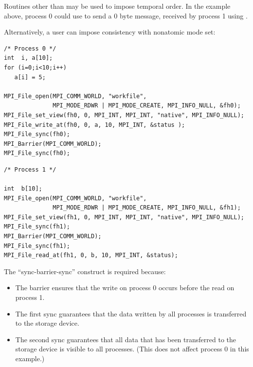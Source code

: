 \begin{users}
Routines other than  may be used to impose 
temporal order.  In the example above, process 0 could use 
to send a 0 byte message, received by process 1 using .
\end{users}

\begin{example}
\label{io-consistencysync}
Alternatively, a user can impose consistency with nonatomic mode set:

\begin{lstlisting}[language={[MPI]C}]
/* Process 0 */
int  i, a[10];
for (i=0;i<10;i++)
   a[i] = 5;

MPI_File_open(MPI_COMM_WORLD, "workfile",
              MPI_MODE_RDWR | MPI_MODE_CREATE, MPI_INFO_NULL, &fh0);
MPI_File_set_view(fh0, 0, MPI_INT, MPI_INT, "native", MPI_INFO_NULL);
MPI_File_write_at(fh0, 0, a, 10, MPI_INT, &status );
MPI_File_sync(fh0);
MPI_Barrier(MPI_COMM_WORLD);
MPI_File_sync(fh0);
\end{lstlisting}

\begin{lstlisting}[language={[MPI]C}]
/* Process 1 */

int  b[10];
MPI_File_open(MPI_COMM_WORLD, "workfile",
              MPI_MODE_RDWR | MPI_MODE_CREATE, MPI_INFO_NULL, &fh1);
MPI_File_set_view(fh1, 0, MPI_INT, MPI_INT, "native", MPI_INFO_NULL);
MPI_File_sync(fh1);
MPI_Barrier(MPI_COMM_WORLD);
MPI_File_sync(fh1);
MPI_File_read_at(fh1, 0, b, 10, MPI_INT, &status);
\end{lstlisting}

The ``sync-barrier-sync'' construct is required because:
\begin{itemize}
\item The barrier ensures that the write on process 0 occurs
before the read on process 1.
\item The first sync guarantees that the data written by all
processes is transferred to the storage device.  
\item The second sync guarantees that all data that has been
transferred to the storage device is visible to all processes.
(This does not affect process 0 in this example.)
\end{itemize}
\end{example}

